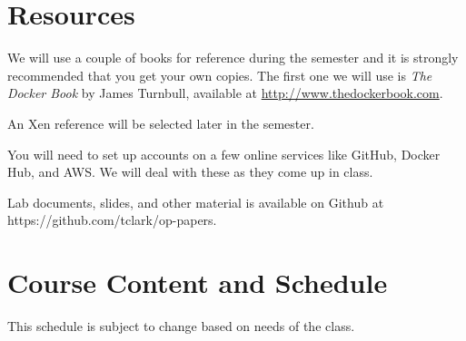 \documentclass{article}
\begin{document}
\section*{Resources}
We will use a couple of books for reference during the semester and it is strongly recommended that you get your own copies.  The first one we will use is \emph{The Docker Book} by James Turnbull, available at \url{http://www.thedockerbook.com}.

An Xen reference will be selected later in the semester.

You will need to set up accounts on a few online services like GitHub, Docker Hub, and AWS.  We will deal with these as they come up in class.

Lab documents, slides, and other material is available on Github at https://github.com/tclark/op-papers.

\newpage 

\section*{Course Content and Schedule}
This schedule is subject to change based on needs of the class.
\end{document}
